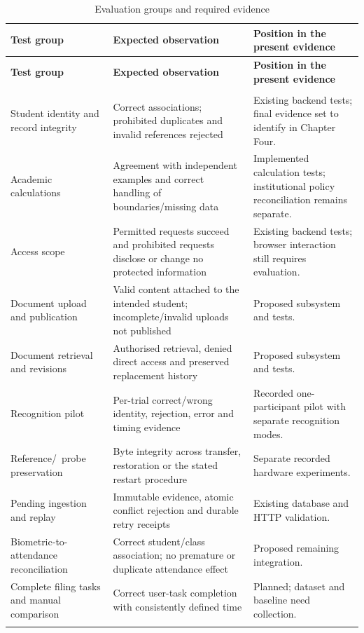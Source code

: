\begingroup
\singlespacing%
\setlength{\tabcolsep}{4pt}
\begin{longtable}{@{}>{\RaggedRight\arraybackslash}p{}>{\RaggedRight\arraybackslash}p{}>{\RaggedRight\arraybackslash}p{}@{}}
\caption{Evaluation groups and required evidence}\label{tab:3-9}\\
\toprule
\textbf{Test group} & \textbf{Expected observation} & \textbf{Position in the present evidence} \\
\midrule
\endfirsthead%
\toprule
\textbf{Test group} & \textbf{Expected observation} & \textbf{Position in the present evidence} \\
\midrule
\endhead%
\midrule
\multicolumn{3}{r}{Continued on next page}\\
\endfoot%
\bottomrule
\endlastfoot%
Student identity and record integrity & Correct associations; prohibited duplicates and invalid references rejected & Existing backend tests; final evidence set to identify in Chapter Four. \\ \addlinespace
Academic calculations & Agreement with independent examples and correct handling of boundaries/missing data & Implemented calculation tests; institutional policy reconciliation remains separate. \\ \addlinespace
Access scope & Permitted requests succeed and prohibited requests disclose or change no protected information & Existing backend tests; browser interaction still requires evaluation. \\ \addlinespace
Document upload and publication & Valid content attached to the intended student; incomplete/invalid uploads not published & Proposed subsystem and tests. \\ \addlinespace
Document retrieval and revisions & Authorised retrieval, denied direct access and preserved replacement history & Proposed subsystem and tests. \\ \addlinespace
Recognition pilot & Per-trial correct/wrong identity, rejection, error and timing evidence & Recorded one-participant pilot with separate recognition modes. \\ \addlinespace
Reference/\allowbreak~probe preservation & Byte integrity across transfer, restoration or the stated restart procedure & Separate recorded hardware experiments. \\ \addlinespace
Pending ingestion and replay & Immutable evidence, atomic conflict rejection and durable retry receipts & Existing database and HTTP validation. \\ \addlinespace
Biometric-to-attendance reconciliation & Correct student/class association; no premature or duplicate attendance effect & Proposed remaining integration. \\ \addlinespace
Complete filing tasks and manual comparison & Correct user-task completion with consistently defined time & Planned; dataset and baseline need collection. \\ \addlinespace
\end{longtable}
\endgroup
